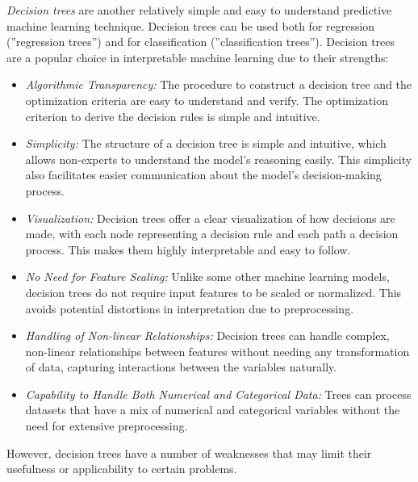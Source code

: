 \emph{Decision trees} are another relatively simple and easy to understand predictive machine learning technique. Decision trees can be used both for regression (''regression trees'') and for classification (''classification trees''). Decision trees are a popular choice in interpretable machine learning due to their strengths:

\begin{itemize}
\item \emph{Algorithmic Transparency:} The procedure to construct a decision tree and the optimization criteria are easy to understand and verify. The optimization criterion to derive the decision rules is simple and intuitive. 
\item \emph{Simplicity:} The structure of a decision tree is simple and intuitive, which allows non-experts to understand the model's reasoning easily. This simplicity also facilitates easier communication about the model's decision-making process.
\item \emph{Visualization:} Decision trees offer a clear visualization of how decisions are made, with each node representing a decision rule and each path a decision process. This makes them highly interpretable and easy to follow.
\item \emph{No Need for Feature Scaling:} Unlike some other machine learning models, decision trees do not require input features to be scaled or normalized. This avoids potential distortions in interpretation due to preprocessing.
\item \emph{Handling of Non-linear Relationships:} Decision trees can handle complex, non-linear relationships between features without needing any transformation of data, capturing interactions between the variables naturally.
\item \emph{Capability to Handle Both Numerical and Categorical Data:} Trees can process datasets that have a mix of numerical and categorical variables without the need for extensive preprocessing.
\end{itemize}

However, decision trees have a number of weaknesses that may limit their usefulness or applicability to certain problems. 

